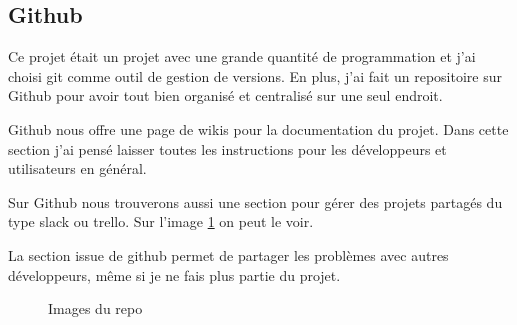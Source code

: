 \documentclass[12pt]{article}
\begin{document}
\subsection{Github}
\begin{par}
Ce projet était un projet avec une grande quantité de programmation et j'ai choisi git comme outil de gestion de versions. En plus, 	j'ai fait un repositoire sur Github pour avoir tout bien organisé et centralisé sur une seul endroit.
\end{par}

\begin{par}
 Github nous offre une page de wikis pour la documentation du projet. Dans cette section j'ai pensé laisser toutes les instructions pour les développeurs et utilisateurs en général.
\end{par}
\begin{par}
	Sur Github nous trouverons aussi une section pour gérer des projets partagés du type slack ou 	trello. Sur l'image \ref{img:git_all} on peut le voir.
\end{par}

\begin{par}
La section issue de github permet de partager les problèmes avec autres développeurs, même si je ne fais plus partie du projet.
\end{par}

\begin{figure}[!htb]
	\centering
	\caption{Images du repo}
	\label{img:git_all}
\end{figure}
\end{document}

